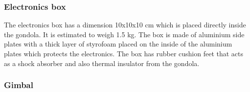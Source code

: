 \subsubsection{Electronics box}
\label{sec:4.4.2}


The electronics box has a dimension 10x10x10 cm which is placed directly inside the gondola. It is estimated to weigh 1.5 kg. The box is made of aluminium side plates with a thick layer of styrofoam placed on the inside of the aluminium plates which protects the electronics. The box has rubber cushion feet that acts as a shock absorber and also thermal insulator from the gondola.

\subsubsection{Gimbal}
\label {sec:4.4.3}

